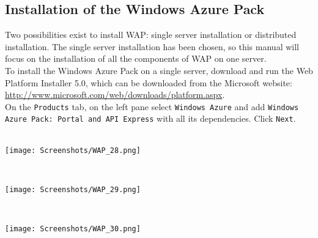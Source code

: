 \clearpage

\subsection{Installation of the Windows Azure Pack}

Two possibilities exist to install WAP: single server installation or distributed installation. The single server installation has been chosen, so this manual will focus on the installation of all the components of WAP on one server. \\
To install the Windows Azure Pack on a single server, download and run the Web Platform Installer 5.0, which can be downloaded from the Microsoft website: \url{http://www.microsoft.com/web/downloads/platform.aspx}. \\
On the \texttt{Products} tab, on the left pane select \texttt{Windows Azure} and add \texttt{Windows Azure Pack: Portal and API Express} with all its dependencies. Click \texttt{Next}.
$\;$ \\ \\
\noindent\begin{minipage}{\textwidth}
    \centering
    \texttt{[image: Screenshots/WAP\_28.png]}
\end{minipage}
$\;$ \\ \\
\noindent\begin{minipage}{\textwidth}
    \centering
    \texttt{[image: Screenshots/WAP\_29.png]}
\end{minipage}
$\;$ \\ \\
\noindent\begin{minipage}{\textwidth}
    \centering
    \texttt{[image: Screenshots/WAP\_30.png]}
\end{minipage}

